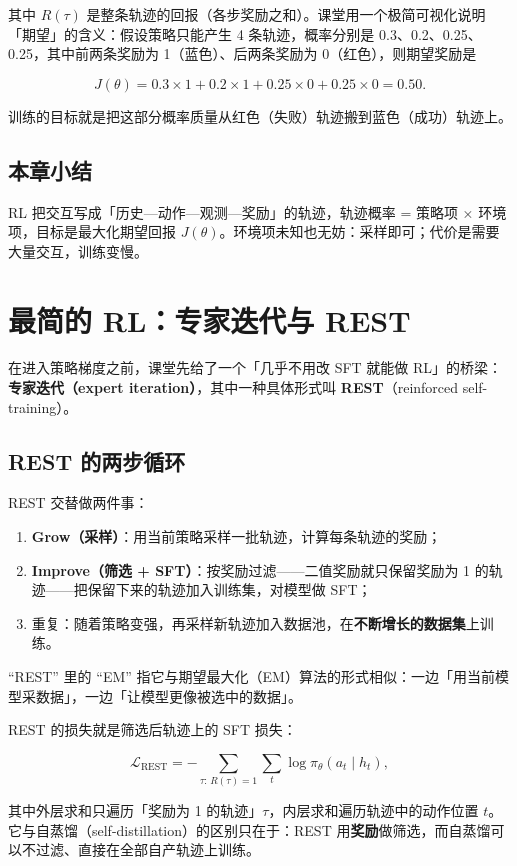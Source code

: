 \documentclass[a4paper]{article}
\begin{document}
其中 $R(\tau)$ 是整条轨迹的回报（各步奖励之和）。课堂用一个极简可视化说明「期望」的含义：假设策略只能产生 4 条轨迹，概率分别是 0.3、0.2、0.25、0.25，其中前两条奖励为 1（蓝色）、后两条奖励为 0（红色），则期望奖励是

$$
J(\theta) = 0.3 \times 1 + 0.2 \times 1 + 0.25 \times 0 + 0.25 \times 0 = 0.50 .
$$

训练的目标就是把这部分概率质量从红色（失败）轨迹搬到蓝色（成功）轨迹上。

\subsection{本章小结}
RL 把交互写成「历史—动作—观测—奖励」的轨迹，轨迹概率 = 策略项 × 环境项，目标是最大化期望回报 $J(\theta)$。环境项未知也无妨：采样即可；代价是需要大量交互，训练变慢。

\section{最简的 RL：专家迭代与 REST}

在进入策略梯度之前，课堂先给了一个「几乎不用改 SFT 就能做 RL」的桥梁：\textbf{专家迭代（expert iteration）}，其中一种具体形式叫 \textbf{REST}（reinforced self-training）。

\subsection{REST 的两步循环}

REST 交替做两件事：

\begin{enumerate}
\item \textbf{Grow（采样）}：用当前策略采样一批轨迹，计算每条轨迹的奖励；
\item \textbf{Improve（筛选 + SFT）}：按奖励过滤——二值奖励就只保留奖励为 1 的轨迹——把保留下来的轨迹加入训练集，对模型做 SFT；
\item 重复：随着策略变强，再采样新轨迹加入数据池，在\textbf{不断增长的数据集}上训练。
\end{enumerate}

``REST'' 里的 ``EM'' 指它与期望最大化（EM）算法的形式相似：一边「用当前模型采数据」，一边「让模型更像被选中的数据」。

REST 的损失就是筛选后轨迹上的 SFT 损失：

$$
\mathcal{L}_{\text{REST}} = -\sum_{\tau:\, R(\tau)=1} \sum_{t} \log \pi_\theta(a_t \mid h_t),
$$

其中外层求和只遍历「奖励为 1 的轨迹」$\tau$，内层求和遍历轨迹中的动作位置 $t$。它与自蒸馏（self-distillation）的区别只在于：REST 用\textbf{奖励}做筛选，而自蒸馏可以不过滤、直接在全部自产轨迹上训练。
\end{document}
